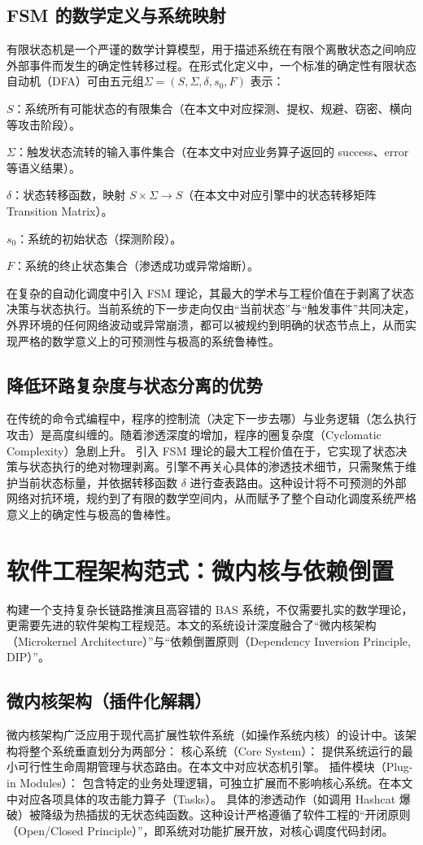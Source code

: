 \documentclass[twoside,openright]{xduugthesis}
\begin{document}
\subsection{FSM 的数学定义与系统映射}
有限状态机是一个严谨的数学计算模型，用于描述系统在有限个离散状态之间响应外部事件而发生的确定性转移过程。在形式化定义中，一个标准的确定性有限状态自动机（DFA）可由五元组$\Sigma = (S, \Sigma, \delta, s_0, F)$ 表示：

$S$：系统所有可能状态的有限集合（在本文中对应探测、提权、规避、窃密、横向等攻击阶段）。

$\Sigma$：触发状态流转的输入事件集合（在本文中对应业务算子返回的 success、error 等语义结果）。

$\delta$：状态转移函数，映射 $S \times \Sigma \rightarrow S$（在本文中对应引擎中的状态转移矩阵 Transition Matrix）。

$s_0$：系统的初始状态（探测阶段）。

$F$：系统的终止状态集合（渗透成功或异常熔断）。


在复杂的自动化调度中引入 FSM 理论，其最大的学术与工程价值在于剥离了状态决策与状态执行。当前系统的下一步走向仅由“当前状态”与“触发事件”共同决定，外界环境的任何网络波动或异常崩溃，都可以被规约到明确的状态节点上，从而实现严格的数学意义上的可预测性与极高的系统鲁棒性。

\subsection{降低环路复杂度与状态分离的优势}
在传统的命令式编程中，程序的控制流（决定下一步去哪）与业务逻辑（怎么执行攻击）是高度纠缠的。随着渗透深度的增加，程序的圈复杂度（Cyclomatic Complexity）急剧上升。
引入 FSM 理论的最大工程价值在于，它实现了状态决策与状态执行的绝对物理剥离。引擎不再关心具体的渗透技术细节，只需聚焦于维护当前状态标量，并依据转移函数 $\delta$ 进行查表路由。这种设计将不可预测的外部网络对抗环境，规约到了有限的数学空间内，从而赋予了整个自动化调度系统严格意义上的确定性与极高的鲁棒性。

\section{软件工程架构范式：微内核与依赖倒置}
构建一个支持复杂长链路推演且高容错的 BAS 系统，不仅需要扎实的数学理论，更需要先进的软件架构工程规范。本文的系统设计深度融合了“微内核架构（Microkernel Architecture）”与“依赖倒置原则（Dependency Inversion Principle, DIP）”。

\subsection{微内核架构（插件化解耦）}
微内核架构广泛应用于现代高扩展性软件系统（如操作系统内核）的设计中\cite{richards2020fundamentals}。该架构将整个系统垂直划分为两部分：
核心系统（Core System）： 提供系统运行的最小可行性生命周期管理与状态路由。在本文中对应状态机引擎。
插件模块（Plug-in Modules）： 包含特定的业务处理逻辑，可独立扩展而不影响核心系统。在本文中对应各项具体的攻击能力算子（Tasks）。
具体的渗透动作（如调用 Hashcat 爆破）被降级为热插拔的无状态纯函数。这种设计严格遵循了软件工程的“开闭原则（Open/Closed Principle）”，即系统对功能扩展开放，对核心调度代码封闭。
\end{document}
